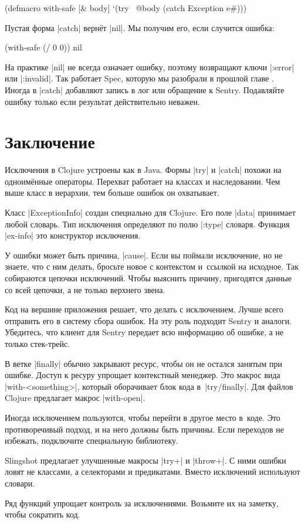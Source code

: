 \begin{english}
  \begin{clojure}
(defmacro with-safe [& body]
  `(try
     ~@body
     (catch Exception e#)))
  \end{clojure}
\end{english}

\noindent
Пустая форма \spverb|catch| верн\"{е}т \spverb|nil|. Мы получим его, если случится
ошибка:

\begin{english}
  \begin{clojure}
(with-safe (/ 0 0))
nil
  \end{clojure}
\end{english}

На практике \spverb|nil| не всегда означает ошибку, поэтому возвращают ключи
\spverb|:error| или \spverb|:invalid|. Так работает Spec, которую мы разобрали в
прошлой главе . Иногда в \spverb|catch| добавляют запись в
лог или обращение к Sentry. Подавляйте ошибку только если результат
действительно неважен.

\section{Заключение}

Исключения в Clojure устроены как в Java. Формы \spverb|try| и \spverb|catch|
похожи на одноим\"{е}нные операторы. Перехват работает на классах и
наследовании. Чем выше класс в иерархии, тем больше ошибок он охватывает.

Класс \spverb|ExceptionInfo| создан специально для Clojure. Его поле
\spverb|data| принимает любой словарь. Тип исключения определяют по полю
\spverb|:type| словаря. Функция \spverb|ex-info| это конструктор исключения.

У ошибки может быть причина, \spverb|cause|. Если вы поймали исключение, но не
знаете, что с ним делать, бросьте новое с контекстом и~ссылкой на исходное. Так
собираются цепочки исключений. Чтобы выяснить причину, пригодятся данные со всей
цепочки, а не только верхнего звена.

Код на вершине приложения решает, что делать с исключением. Лучше всего
отправить его в систему сбора ошибок. На эту роль подходит Sentry и
аналоги. Убедитесь, что клиент для Sentry передает всю информацию об ошибке, а не
только стек-трейс.

В ветке \spverb|finally| обычно закрывают ресурс, чтобы он не остался занятым
при ошибке. Доступ к ресуру упрощает контекстный менеджер. Это макрос вида
\spverb|with-<something>|, который оборачивает блок кода
в~\spverb|try/finally|. Для файлов Clojure предлагает макрос \spverb|with-open|.

Иногда исключением пользуются, чтобы перейти в другое место в~коде. Это
противоречивый подход, и на него должны быть причины. Если переходов не
избежать, подключите специальную библиотеку.

Slingshot предлагает улучшенные макросы \spverb|try+| и \spverb|throw+|. С ними
ошибки ловят не классами, а селекторами и предикатами. Вместо исключений
используют словари.

Ряд функций упрощает контроль за исключениями. Возьмите их на заметку, чтобы
сократить код.
